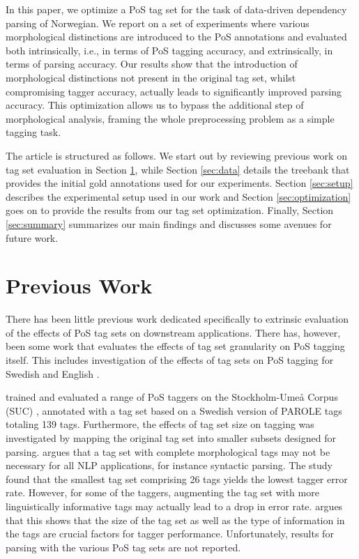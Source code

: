 \documentclass[11pt,a4paper]{article}
\begin{document}
In this paper, we optimize a PoS tag set for the task of data-driven dependency
parsing of Norwegian. We report on a set of experiments where various
morphological distinctions are introduced to the PoS annotations and evaluated
both intrinsically, i.e., in terms of PoS tagging accuracy, and extrinsically,
in terms of parsing accuracy. Our results show that the introduction of
morphological distinctions not present in the original tag set, whilst
compromising tagger accuracy, actually leads to significantly improved parsing
accuracy. This optimization allows us to bypass the additional step of
morphological analysis, framing the whole preprocessing problem as a simple
tagging task.

The article is structured as follows. We start out by reviewing previous work
on tag set evaluation in Section \ref{sec:prev}, while Section \ref{sec:data}
details the treebank that provides the initial gold annotations used for our
experiments. Section \ref{sec:setup} describes the experimental setup used in
our work and Section \ref{sec:optimization} goes on to provide the results from
our tag set optimization. Finally, Section \ref{sec:summary} summarizes our
main findings and discusses some avenues for future work.

\section{Previous Work}
\label{sec:prev}
There has been little previous work dedicated specifically to extrinsic
evaluation of the effects of PoS tag sets on downstream applications.  There
has, however, been some work that evaluates the effects of tag set granularity
on PoS tagging itself. This includes investigation of the effects of tag sets
on PoS tagging for Swedish \cite{Meg:01,Meg:02} and English \cite{Mac:05}.

 trained and evaluated a range of PoS taggers on the
Stockholm-Umeå Corpus (SUC) \cite{Gus:Har:06}, annotated with a tag set based
on a Swedish version of PAROLE tags totaling 139 tags. Furthermore, the effects
of tag set size on tagging was investigated by mapping the original tag set
into smaller subsets designed for parsing.  argues that a tag
set with complete morphological tags may not be necessary for all NLP
applications, for instance syntactic parsing. The study found that the smallest
tag set comprising 26 tags yields the lowest tagger error rate. However, for
some of the taggers, augmenting the tag set with more linguistically
informative tags may actually lead to a drop in error rate. 
argues that this shows that the size of the tag set as well as the type of
information in the tags are crucial factors for tagger performance.
Unfortunately, results for parsing with the various PoS tag sets are not
reported.
\end{document}
